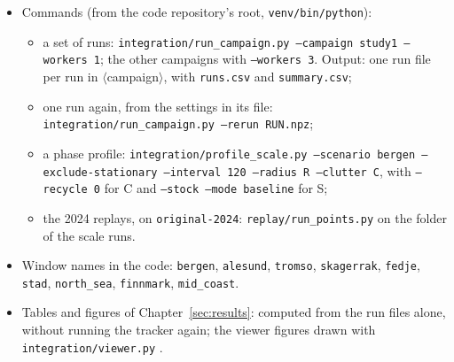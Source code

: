 \begin{itemize}
    \item Commands (from the code repository's root, \texttt{venv/bin/python}):
    \begin{itemize}\raggedright
        \item a set of runs: \texttt{integration/run\_campaign.py --campaign study1 --workers 1}; the other campaigns with \texttt{--workers 3}. Output: one run file per run in $\langle$campaign$\rangle$, with \texttt{runs.csv} and \texttt{summary.csv};
        \item one run again, from the settings in its file: \texttt{integration/run\_campaign.py --rerun RUN.npz};
        \item a phase profile: \texttt{integration/profile\_scale.py --scenario bergen --exclude-stationary --interval 120 --radius R --clutter C}, with \texttt{--recycle 0} for C and \texttt{--stock --mode baseline} for S;
        \item the 2024 replays, on \texttt{original-2024}: \texttt{replay/run\_points.py} on the folder of the scale runs.
    \end{itemize}
    \item Window names in the code: \texttt{bergen}, \texttt{alesund}, \texttt{tromso}, \texttt{skagerrak}, \texttt{fedje}, \texttt{stad}, \texttt{north\_sea}, \texttt{finnmark}, \texttt{mid\_coast}.
    \item Tables and figures of Chapter~\ref{sec:results}: computed from the run files alone, without running the tracker again; the viewer figures drawn with \texttt{integration/viewer.py} .
\end{itemize}
